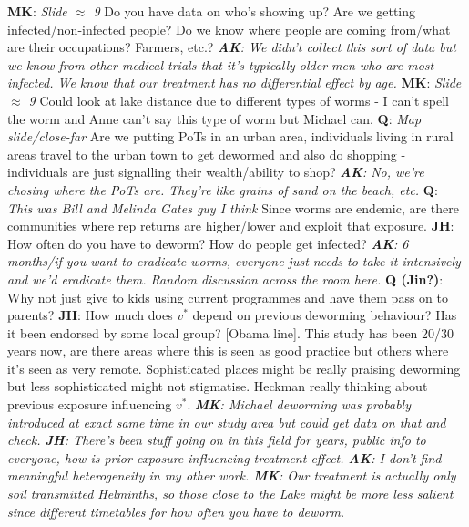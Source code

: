 \documentclass{article}
\begin{document}
\textbf{MK}: \emph{Slide $\approx$ 9} Do you have data on who's showing up? Are we getting 
infected/non-infected people? Do we know where people are coming from/what are their occupations? Farmers, etc.?
\emph{
    \textbf{AK}: We didn't collect this sort of data but we know from other medical trials 
    that it's typically older men who are most infected.
    We know that our treatment has no differential effect by age.
}
\newline
\newline
\textbf{MK}: \emph{Slide $\approx$ 9} Could look at lake distance due to different types of worms - I can't spell 
the worm and Anne can't say this type of worm but Michael can.
\newline
\newline
\textbf{Q}: \emph{Map slide/close-far} Are we putting PoTs in an urban area, individuals living 
in rural areas travel to the urban town to get dewormed and also do shopping - individuals are 
just signalling their wealth/ability to shop?
\emph{
    \textbf{AK}: No, we're chosing where the PoTs are. They're like grains of sand on the beach, etc.
}
\newline
\newline
\textbf{Q}: \emph{This was Bill and Melinda Gates guy I think} Since worms are endemic, are there communities where rep returns are higher/lower 
and exploit that exposure.
\newline
\newline
\textbf{JH}: How often do you have to deworm? How do people get infected? 
\emph{
    \textbf{AK}: 6 months/if you want to eradicate worms, everyone just needs to take it intensively and 
    we'd eradicate them. Random discussion across the room here.
}
\newline
\newline
\textbf{Q (Jin?)}: Why not just give to kids using current programmes and have them 
pass on to parents?
\newline
\newline
\textbf{JH}: How much does $v^*$ depend on previous deworming behaviour? Has it 
been endorsed by some local group? [Obama line]. This study has been 20/30 years now, 
are there areas where this is seen as good practice but others where it's seen as 
very remote.
Sophisticated places might be really praising deworming but less sophisticated might 
not stigmatise. Heckman really thinking about previous exposure influencing $v^*$.
\emph{\textbf{MK}: Michael deworming was probably introduced at exact same time in our study 
area but could get data on that and check. \textbf{JH}: There's been stuff going on 
in this field for years, public info to everyone, how is prior exposure influencing 
treatment effect.
\textbf{AK}: I don't find meaningful heterogeneity in my other work. 
\textbf{MK}: Our treatment is actually only soil transmitted Helminths, so 
those close to the Lake might be more less salient since different timetables for 
how often you have to deworm.
}
\end{document}
